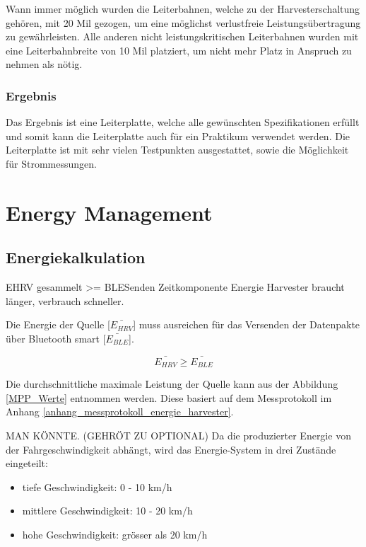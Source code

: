 Wann immer möglich wurden die Leiterbahnen, welche zu der Harvesterschaltung gehören, mit 20 Mil gezogen, um eine möglichst verlustfreie Leistungsübertragung zu gewährleisten. Alle anderen nicht leistungskritischen Leiterbahnen wurden mit eine Leiterbahnbreite von 10 Mil platziert, um nicht mehr Platz in Anspruch zu nehmen als nötig.

\subsubsection{Ergebnis}

Das Ergebnis ist eine Leiterplatte, welche alle gewünschten Spezifikationen erfüllt und somit kann die Leiterplatte auch für ein Praktikum verwendet werden. Die Leiterplatte ist mit sehr vielen Testpunkten ausgestattet, sowie die Möglichkeit für Strommessungen.


\section{Energy Management}

\subsection{Energiekalkulation}
EHRV gesammelt >= BLESenden
Zeitkomponente
Energie Harvester braucht länger, verbrauch schneller.

Die Energie der Quelle [$\bar{E_{HRV}} $] muss ausreichen für das Versenden der Datenpakte über Bluetooth smart [$\bar{E_{BLE}}$].

\[\bar{E_{HRV}} \ge \bar{E_{BLE}}  \]


Die durchschnittliche maximale Leistung der Quelle kann aus der Abbildung \ref{MPP_Werte} entnommen werden. Diese basiert auf dem Messprotokoll im Anhang \ref{anhang_messprotokoll_energie_harvester}. 

MAN KÖNNTE. (GEHRÖT ZU OPTIONAL) Da die produzierter Energie von der Fahrgeschwindigkeit abhängt, wird das Energie-System in drei Zustände eingeteilt:

\begin{itemize}
    \item tiefe Geschwindigkeit: 0 - 10 km/h
    \item mittlere Geschwindigkeit: 10 - 20 km/h 
    \item hohe Geschwindigkeit: grösser als 20 km/h 
\end{itemize}

